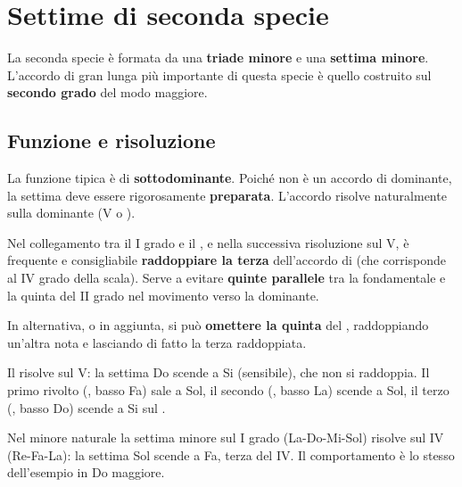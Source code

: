 \chapter{Settime di seconda specie}
\label{chap:seconda_specie}

La seconda specie è formata da una \textbf{triade minore} e una \textbf{settima minore}. L'accordo di gran lunga più importante di questa specie è quello costruito sul \textbf{secondo grado} del modo maggiore.

\section{Funzione e risoluzione}
\label{sec:seconda_specie_dettaglio}

La funzione tipica è di \textbf{sottodominante}. Poiché non è un accordo di dominante, la settima deve essere rigorosamente \textbf{preparata}. L'accordo risolve naturalmente sulla dominante (V o ).

\begin{regola}
    \label{reg:ii7_raddoppio}
    Nel collegamento tra il I grado e il , e nella successiva risoluzione sul V, è frequente e consigliabile \textbf{raddoppiare la terza} dell'accordo di  (che corrisponde al IV grado della scala). Serve a evitare \textbf{quinte parallele} tra la fondamentale e la quinta del II grado nel movimento verso la dominante.

	In alternativa, o in aggiunta, si può \textbf{omettere la quinta} del , raddoppiando un'altra nota e lasciando di fatto la terza raddoppiata.
\end{regola}

\begin{esempio}
    Il  risolve sul V: la settima Do scende a Si (sensibile), che non si raddoppia. Il primo rivolto (, basso Fa) sale a Sol, il secondo (, basso La) scende a Sol, il terzo (, basso Do) scende a Si sul .
\end{esempio}

\begin{esempio}
	\label{ex:i7_minore}
	Nel minore naturale la settima minore sul I grado (La-Do-Mi-Sol) risolve sul IV (Re-Fa-La): la settima Sol scende a Fa, terza del IV. Il comportamento è lo stesso dell'esempio in Do maggiore.
\end{esempio}

